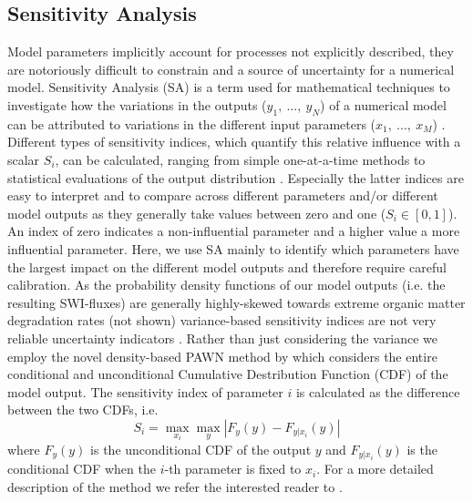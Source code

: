 \documentclass[gmd, manuscript]{copernicus}
\begin{document}
\subsection{Sensitivity Analysis}
Model parameters implicitly account for processes not explicitly described, they are notoriously difficult to constrain and a source of uncertainty for a numerical model. Sensitivity Analysis (SA) is a term used for mathematical 
techniques to investigate how the variations in the outputs ($y_1,\ ...,\ y_N$) of a numerical model can be attributed to variations in the different input parameters ($x_1,\ ...,\ x_M$) \citep{pianosi_sensitivity_2016}. 
Different types of sensitivity indices, which quantify this relative influence with a scalar $S_i$, can be calculated, ranging from simple one-at-a-time methods to statistical evaluations of the 
output distribution \citep[e.g. variance-based or density-based approaches][]{pianosi_sensitivity_2016}. Especially the latter indices are easy to interpret and to compare across different parameters and/or different model outputs as 
they generally take values between zero and one ($S_i \in [0, 1]$). An index of zero indicates a non-influential parameter and a higher value a more influential parameter. 
Here, we use SA mainly to identify which parameters have the largest impact on the different model outputs and therefore require careful calibration. 
As the probability density functions of our model outputs (i.e. the resulting SWI-fluxes) are generally highly-skewed towards extreme organic matter degradation rates (not shown) variance-based sensitivity indices are not very 
reliable uncertainty indicators \citep{pianosi_sensitivity_2016}. Rather than just considering the variance we employ the novel density-based PAWN method by \citep{pianosi_simple_2015} which considers the entire conditional and unconditional 
Cumulative Destribution Function (CDF) of the model output. %
The sensitivity index of parameter $i$ is calculated as the difference between the two CDFs, i.e.
\begin{equation}
 S_i = \max_{x_i} \max_{y} | F_y(y) - F_{y|x_i}(y) |
\end{equation}
where $F_y(y)$ is the unconditional CDF of the output $y$ and $F_{y|x_i}(y)$ is the conditional CDF when the $i$-th parameter is fixed to $x_i$. For a more detailed description of the method we refer the interested reader to \citet{pianosi_simple_2015}. 
\end{document}
